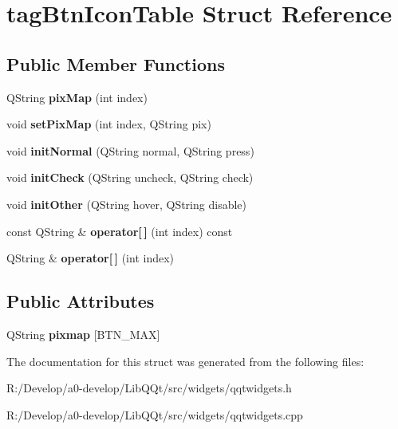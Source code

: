 \hypertarget{structtag_btn_icon_table}{}\section{tag\+Btn\+Icon\+Table Struct Reference}
\label{structtag_btn_icon_table}
\subsection*{Public Member Functions}
\begin{DoxyCompactItemize}
\item 
\mbox{\label{structtag_btn_icon_table_a36067991cdbbb34c6faf78d5c2f7a039}} 
Q\+String {\bfseries pix\+Map} (int index)
\item 
\mbox{\label{structtag_btn_icon_table_ae752ab3db683372622189d675c57ff7c}} 
void {\bfseries set\+Pix\+Map} (int index, Q\+String pix)
\item 
\mbox{\label{structtag_btn_icon_table_a982012e810a5bdb8b338346dcd4c8826}} 
void {\bfseries init\+Normal} (Q\+String normal, Q\+String press)
\item 
\mbox{\label{structtag_btn_icon_table_a809e0b17caaf411eb261dee32066bd28}} 
void {\bfseries init\+Check} (Q\+String uncheck, Q\+String check)
\item 
\mbox{\label{structtag_btn_icon_table_a2e792d6bb353b532a76ea51e1fb84791}} 
void {\bfseries init\+Other} (Q\+String hover, Q\+String disable)
\item 
\mbox{\label{structtag_btn_icon_table_a4600fe50d931fb5f3c10e34b0e99defa}} 
const Q\+String \& {\bfseries operator\mbox{[}$\,$\mbox{]}} (int index) const
\item 
\mbox{\label{structtag_btn_icon_table_adeb2b0b4148a89ef59fe166ebe650620}} 
Q\+String \& {\bfseries operator\mbox{[}$\,$\mbox{]}} (int index)
\end{DoxyCompactItemize}
\subsection*{Public Attributes}
\begin{DoxyCompactItemize}
\item 
\mbox{\label{structtag_btn_icon_table_a5baab143012aa976e5301f5c1b085c06}} 
Q\+String {\bfseries pixmap} \mbox{[}B\+T\+N\+\_\+\+M\+AX\mbox{]}
\end{DoxyCompactItemize}


The documentation for this struct was generated from the following files\+:\begin{DoxyCompactItemize}
\item 
R\+:/\+Develop/a0-\/develop/\+Lib\+Q\+Qt/src/widgets/qqtwidgets.\+h\item 
R\+:/\+Develop/a0-\/develop/\+Lib\+Q\+Qt/src/widgets/qqtwidgets.\+cpp\end{DoxyCompactItemize}
